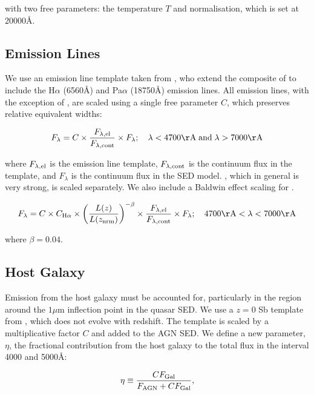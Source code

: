 with two free parameters: the temperature $T$ and normalisation, which is set at 20000\AA. 

\subsection{Emission Lines}

We use an emission line template taken from \citet{maddox06}, who extend the composite of \citet{francis91} to include the H$\alpha$ (6560\AA) and Pa$\alpha$ (18750\AA) emission lines. 
All emission lines, with the exception of \hans, are scaled using a single free parameter $C$, which preserves relative equivalent widths:

\begin{eqnarray}
  F_{\lambda} =  C \times \frac{F_{\lambda, \rm el}}{F_{\lambda, \rm cont}} \times F_{\lambda} ; \quad \lambda < 4700{\rm \AA} \;{\rm and}\; \lambda > 7000{\rm \AA} 
\end{eqnarray} 

where $F_{\lambda, \rm el}$ is the emission line template, $F_{\lambda,\rm cont}$ is the continuum flux in the template, and $F_{\lambda}$ is the continuum flux in the \ac{SED} model.  
\hans, which in general is very strong, is scaled separately.
We also include a Baldwin effect scaling for \hans. 

\begin{equation}
  F_{\lambda} =  C \times C_{{\rm H} \alpha} \times \left( \frac{L(z)} {L(z_{\rm nrm})} \right)^{-\beta} \times \frac{F_{\lambda, \rm el}}{F_{\lambda, \rm cont}} \times F_{\lambda}; \quad 4700{\rm \AA} < \lambda < 7000{\rm \AA} 
\end{equation}

where $\beta=0.04$. 

\subsection{Host Galaxy}

Emission from the host galaxy must be accounted for, particularly in the region around the $1\mu$m inflection point in the quasar SED. 
We use a $z=0$ Sb template from \citet{mannucci01}, which does not evolve with redshift.
The template is scaled by a multiplicative factor $C$ and added to the \ac{AGN} \ac{SED}. 
We define a new parameter, $\eta$, the fractional contribution from the host galaxy to the total flux in the interval 4000 and 5000\AA:

\begin{eqnarray}
  \eta \equiv \frac{CF_{\rm Gal}}{F_{\rm AGN} + CF_{\rm Gal}},
\end{eqnarray}

